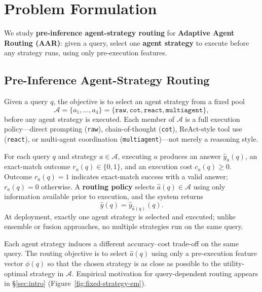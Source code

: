 \section{Problem Formulation}
\label{sec:problem}

We study \textbf{pre-inference agent-strategy routing} for \textbf{Adaptive Agent Routing
(AAR)}: given a query, select one \textbf{agent strategy} to execute before any strategy runs,
using only pre-execution features.

\subsection{Pre-Inference Agent-Strategy Routing}
\label{sec:goal}

Given a query $q$, the objective is to select an agent strategy from a fixed pool
\begin{equation}
  \mathcal{A}=\{a_1,\ldots,a_4\}=\{\texttt{raw},\texttt{cot},\texttt{react},\texttt{multiagent}\},
  \label{eq:strategy-set}
\end{equation}
before any agent strategy is executed.
Each member of $\mathcal{A}$ is a full execution policy---direct prompting (\texttt{raw}),
chain-of-thought (\texttt{cot}), ReAct-style tool use (\texttt{react}), or multi-agent
coordination (\texttt{multiagent})---not merely a reasoning style.

For each query $q$ and strategy $a\in\mathcal{A}$, executing $a$ produces an answer
$\hat{y}_a(q)$, an exact-match outcome $r_a(q)\in\{0,1\}$, and an execution cost
$c_a(q)\ge 0$.
Outcome $r_a(q)=1$ indicates exact-match success with a valid answer; $r_a(q)=0$ otherwise.
A \textbf{routing policy} selects $\hat{a}(q)\in\mathcal{A}$ using only information available
prior to execution, and the system returns
\begin{equation}
  \hat{y}(q)=\hat{y}_{\hat{a}(q)}(q).
  \label{eq:output}
\end{equation}
At deployment, exactly one agent strategy is selected and executed; unlike ensemble or fusion
approaches, no multiple strategies run on the same query.

Each agent strategy induces a different accuracy--cost trade-off on the same query.
The routing objective is to select $\hat{a}(q)$ using only a pre-execution feature vector
$\phi(q)$ so that the chosen strategy is as close as possible to the utility-optimal strategy in
$\mathcal{A}$.
Empirical motivation for query-dependent routing appears in \S\ref{sec:intro}
(Figure~\ref{fig:fixed-strategy-em}).

